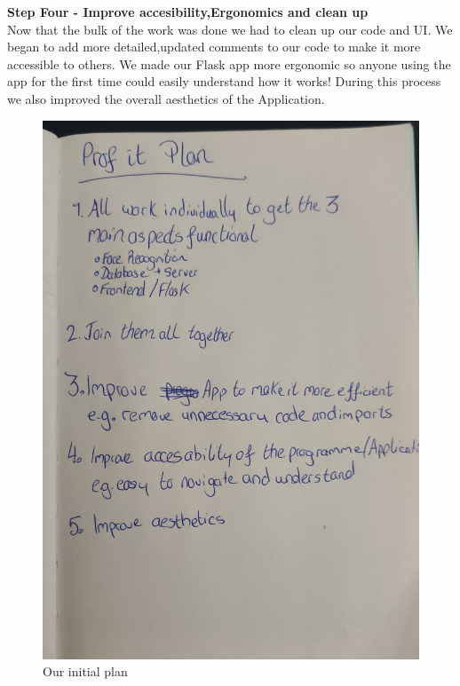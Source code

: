 \documentclass{article}
\begin{document}
\textbf{Step Four - Improve accesibility,Ergonomics and clean up} \\
Now that the bulk of the work was done we had to clean up our code and UI. We began to add more detailed,updated comments to our code to make it more accessible to others. We made our Flask app more ergonomic so anyone using the app for the first time could easily understand how it works! During this process we also improved the overall aesthetics of the Application.

\begin{figure}[h!]
\centering
\includegraphics[scale=0.14]{images/Plan.jpg}
\caption{Our initial plan }
\end{figure}
\newpage
\end{document}
